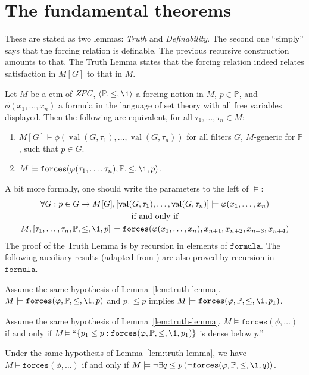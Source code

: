\documentclass[11pt,english]{article}
\renewcommand{\PP}{\mathbb{P}}
\newcommand{\formula}{\ensuremath{\mathtt{formula}}}
\newcommand{\forceisa}{\mathtt{forces}}
\DeclareMathOperator{\val}{val}
\begin{document}
\section{The fundamental theorems}
These are stated as two lemmas: \emph{Truth} and
\emph{Definability}. The second one ``simply'' says that the forcing
relation is definable. The previous recursive construction amounts to
that. The Truth Lemma states that the forcing relation indeed relates
satisfaction in $M[G]$ to that in $M$. 
\begin{lemma}\label{lem:truth-lemma}
  Let $M$ be a ctm of $\mathit{ZFC}$, $\lb\PP,\leq,\1\rb$ a forcing notion
  in $M$, $p\in\PP$, and $\phi(x_1,\dots,x_n)$ a formula in the
  language of set 
  theory with all free variables displayed. Then the
  following are equivalent, for all $\tau_1,\dots,\tau_n\in M$: 
  \begin{enumerate}
  \item     $M[G]\models\phi(\val(G,\tau_1),\dots,\val(G,\tau_n))$ for
    all filters $G$, $M$-generic for $\PP$, such that $p\in G$.
  \item $M\models\forceisa(\phi(\tau_1,\dots,\tau_n),\PP,\leq,\1,p)$.
  \end{enumerate}
\end{lemma}
A bit more formally, one should write the parameters to the left of
$\models$:
\begin{gather*}
  \forall G : p\in G \limp M[G],[\val(G,\tau_1),\dots,\val(G,\tau_n)]
  \models\phi(x_1,\dots,x_n) \\
  \text{if and only if}\\
  M,[\tau_1,\dots,\tau_n,\PP,\leq,\1,p] 
  \models\forceisa(\phi(x_1,\dots,x_n),x_{n+1},x_{n+2},x_{n+3},x_{n+4})
\end{gather*}
The proof of the Truth Lemma is by recursion in elements of
$\formula$. The following auxiliary results (adapted from
\cite[IV.2.43]{kunen2011set}) are also proved by recursion in
$\formula$.
\begin{lemma}\label{lem:strengthen} 
  Assume the same hypothesis of Lemma~\ref{lem:truth-lemma}.
  $M\models\forceisa(\phi,\PP,\leq,\1,p)$ and $p_1\leq p$
  implies $M\models\forceisa(\phi,\PP,\leq,\1,p_1)$.
\end{lemma}
\begin{lemma}\label{lem:density}
  Assume the same hypothesis of Lemma~\ref{lem:truth-lemma}. $M\models\forceisa(\phi,\dots)$ if and only if
    $M\models$``$\{p_1\leq p : \forceisa(\phi,\PP,\leq,\1,p_1)\}$ is
    dense below $p$.''
\end{lemma}
\begin{lemma}\label{lem:forcing-negation}
  Under the same hypothesis of Lemma~\ref{lem:truth-lemma}, we have
  $M\models\forceisa(\phi,\dots)$ if and only if 
  $M\models\neg\exists
  q\leq p \,(\neg \forceisa(\phi,\PP,\leq,\1,q))$.
\end{lemma}
\end{document}
